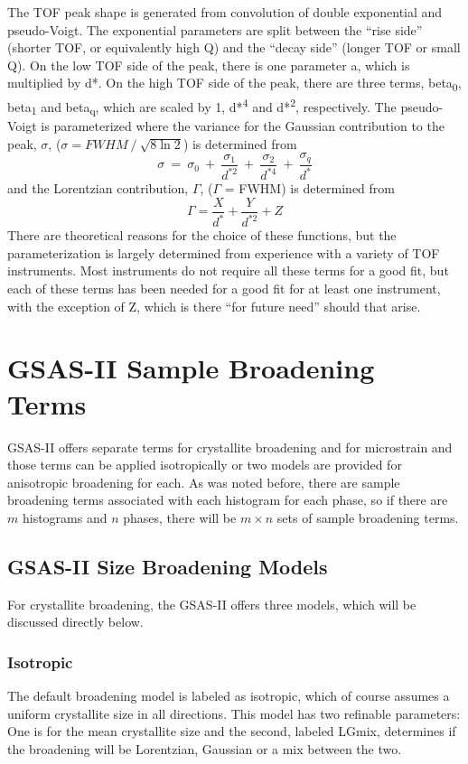 The TOF peak shape is generated from convolution of double exponential and pseudo-Voigt. The exponential parameters are split between the “rise side” (shorter TOF, or equivalently high Q) and the “decay side” (longer TOF or small Q). On the low TOF side of the peak, there is one parameter a, which is multiplied by d*. On the high TOF side of the peak, there are three terms, beta\textsubscript{0}, beta\textsubscript{1} and beta\textsubscript{q}, which are scaled by 1, d*\textsuperscript{4} and d*\textsuperscript{2}, respectively. The pseudo-Voigt is parameterized where the variance for the Gaussian contribution to the peak, $\sigma$, ($\sigma=FWHM\ /\ \sqrt{8\ln{2}}$) is determined from 
$$\sigma\ =\ \sigma_0\ +\ \frac{\sigma_1}{d^{\ast2}}\ +\ \frac{\sigma_2}{d^{\ast4}}\ +\ \frac{\sigma_q}{d^\ast}$$
and the Lorentzian contribution, $\Gamma$, ($\Gamma$ = FWHM) is determined from
$$\Gamma=\frac{X}{d^\ast}+\frac{Y}{d^{\ast2}}+Z$$
There are theoretical reasons for the choice of these functions, but the parameterization is largely determined from experience with a variety of TOF instruments. Most instruments do not require all these terms for a good fit, but each of these terms has been needed for a good fit for at least one instrument, with the exception of Z, which is there ``for future need'' should that arise. 

 
\section{GSAS-II Sample Broadening Terms}
\label{ref:HAP}

GSAS-II offers separate terms for crystallite broadening and for microstrain and those terms can be applied isotropically or two models are provided for anisotropic broadening for each. As was noted before, there are sample broadening terms associated with each histogram for each phase, so if there are $m$ histograms and $n$ phases, there will be $m \times n$ sets of sample broadening terms. 

\subsection{GSAS-II Size Broadening Models}

For crystallite broadening, the GSAS-II offers three models, which will be discussed directly below. 

\subsubsection{Isotropic}
 The default broadening model is labeled as isotropic, which of course assumes a uniform crystallite size in all directions. This model has two refinable parameters: One is for the mean crystallite size and the second, labeled LGmix, determines if the broadening will be Lorentzian, Gaussian or a mix between the two.

